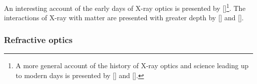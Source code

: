 \begin{refsection}
An interesting account of the early days of X-ray optics is presented by [\cite{Compton1928}]\footnote{A more general account of the history of X-ray optics and science leading up to modern days is presented by [\cite[\textit{§1}]{Willmott2019}] and [\cite[\textit{§2}]{Jacobsen2019}].}. The interactions of X-ray with matter are presented with greater depth by [\cite{Als-Nielsen2011}] and [\cite[\textit{§1} - \textit{\textit{§3}}]{Attwood2016}].


\subsubsection*{Refractive optics}


\end{refsection}
